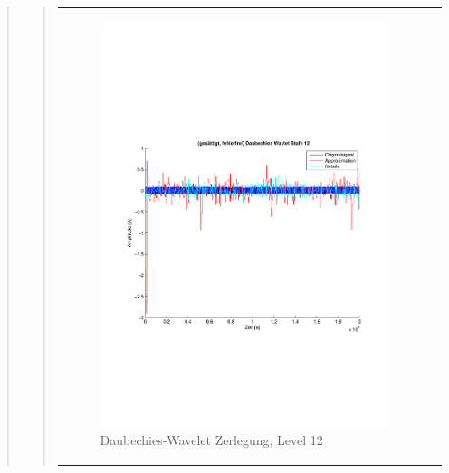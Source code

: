 \begin{quote}
\begin{quote}
\begin{center}
\begin{tabular}{ll}
\begin{minipage}{0.6\textwidth}
                    \end{minipage}
                    \begin{minipage}{0.6\textwidth}
    
                        \begin{figure}[H]
                            \label{fig:}
                            \includegraphics[scale=0.4, trim = 2cm 6cm 1cm
                            7.5cm,
                            clip]{./Bilder/Termin8/fehlerfrei_gesaettigt_Daubechies_Wavlet_lvl_12}
                            \caption{Daubechies-Wavelet Zerlegung, Level 12}
                        \end{figure}
                    \vspace{-1.5em}
    
                    \end{minipage}
    

\end{tabular}
\end{center}
\end{quote}
\end{quote}
